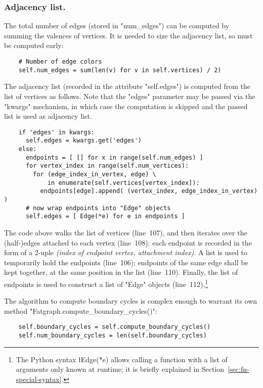 \subsubsection{Adjacency list.}
The total number of edges (stored in "num_edges") can be computed by
summing the valences of vertices.  It is needed to size the adjacency
list, so must be computed early:
\begin{lstlisting}
    # Number of edge colors
    self.num_edges = sum(len(v) for v in self.vertices) / 2)

\end{lstlisting}
The adjacency list (recorded in the attribute "self.edges") is computed
from the list of vertices as follows.  Note that the "edges" parameter
may be passed via the "kwargs" mechanism, in which case the
computation is skipped and the passed list is used as adjacency list.
\begin{lstlisting}
    if 'edges' in kwargs:
      self.edges = kwargs.get('edges')
    else:
      endpoints = [ [] for x in range(self.num_edges) ]
      for vertex_index in range(self.num_vertices):
        for (edge_index_in_vertex, edge) \
            in enumerate(self.vertices[vertex_index]):
          endpoints[edge].append( (vertex_index, edge_index_in_vertex) )
      # now wrap endpoints into "Edge" objects
      self.edges = [ Edge(*e) for e in endpoints ]

\end{lstlisting}
The code above walks the list of vertices (line~107), and then
iterates over the (half-)edges attached to each vertex (line~108):
each endpoint is recorded in the form of a 2-uple \emph{(index of
  endpoint vertex, attachment index)}. A list is used to temporarily
hold the endpoints (line~106); endpoints of the same edge shall be
kept together, at the same position in the list (line~110). Finally,
the list of endpoints is used to construct a list of "Edge" objects
(line~112).\footnote{The Python syntax \l{Edge(*e)} allows calling a
  function with a list of arguments only known at runtime; it is
  briefly explained in Section~\ref{sec:fn-special-syntax}.}

The algorithm to compute boundary cycles is complex enough to warrant
its own method "Fatgraph.compute_boundary_cycles()":
\begin{lstlisting}
    self.boundary_cycles = self.compute_boundary_cycles()
    self.num_boundary_cycles = len(self.boundary_cycles)

\end{lstlisting}

